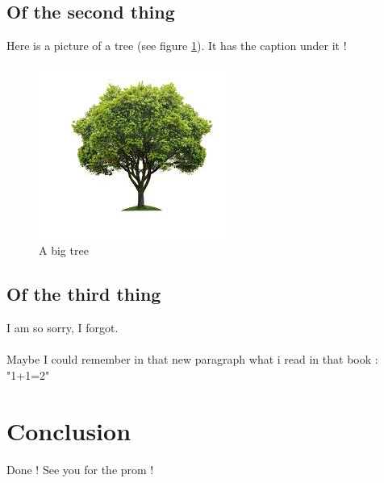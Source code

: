 \documentclass{cranfieldChart}
\begin{document}
\subsection{Of the second thing}
Here is a picture of a tree (see figure \ref{tree}). It has the caption under it !
\begin{figure}[!h]
	\centering
	
	\includegraphics{ressources/tree.jpg}
	\caption{A big tree}
	\label{tree}
\end{figure}
\subsection{Of the third thing}
I am so sorry, I forgot.
\paragraph{}
Maybe I could remember in that new paragraph what i read in that book : "1+1=2" \autocite{ref0}

\newpage
\section{Conclusion}
Done ! See you for the prom !

\newpage

\printbibliography
\end{document}
